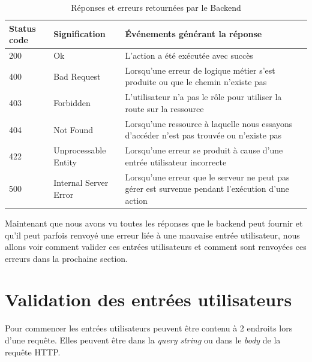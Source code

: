 \documentclass[
    iai, %
    il, %
]{heig-tb}
\begin{document}
\begin{table}[h]
    \begin{center}
        \caption{Réponses et erreurs retournées par le Backend \label{reponses-erreurs-backend}}
        \begin{tabularx}{1.0\textwidth} {l|l|X}
            Status code & Signification         & Événements générant la réponse                                                                   \\ \hline
            200         & Ok                    & L'action a été exécutée avec succès                                                              \\
            400         & Bad Request           & Lorsqu'une erreur de logique métier s'est produite ou que le chemin n'existe pas                 \\
            403         & Forbidden             & L'utilisateur n'a pas le rôle pour utiliser la route sur la ressource                            \\
            404         & Not Found             & Lorsqu'une ressource à laquelle nous essayons d'accéder n'est pas trouvée ou n'existe pas        \\
            422         & Unprocessable Entity  & Lorsqu'une erreur se produit à cause d'une entrée utilisateur incorrecte                         \\
            500         & Internal Server Error & Lorsqu'une erreur que le serveur ne peut pas gérer est survenue pendant l'exécution d'une action \\
        \end{tabularx}
    \end{center}
\end{table}

Maintenant que nous avons vu toutes les réponses que le \Gls{backend} peut fournir et qu'il peut parfois renvoyé une erreur liée à une mauvaise entrée utilisateur, nous allons voir comment valider ces entrées utilisateurs et comment sont renvoyées ces erreurs dans la prochaine section.

\section{Validation des entrées utilisateurs}
Pour commencer les entrées utilisateurs peuvent être contenu à 2 endroits lors d'une requête. Elles peuvent être dans la \emph{query string} ou dans le \emph{body} de la requête HTTP.
\end{document}
